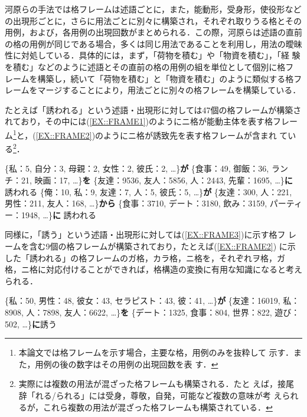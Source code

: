 \documentclass[japanese]{jnlp_1.4}
\begin{document}
 河原らの手法では格フレームは述語ごとに，また，能動形，受身形，使役形など
 の出現形ごとに，さらに用法ごとに別々に構築され，それぞれ取りうる格とその
 用例，および，各用例の出現回数がまとめられる．この際，河原らは述語の直前
 の格の用例が同じである場合，多くは同じ用法であることを利用し，用法の曖昧
 性に対処している．具体的には，まず，「荷物を積む」や「物資を積む」，「経
 験を積む」などのように述語とその直前の格の用例の組を単位として個別に格フ
 レームを構築し，続いて「荷物を積む」と「物資を積む」のように類似する格フ
 レームをマージすることにより，用法ごとに別々の格フレームを構築している．

 たとえば「誘われる」という述語・出現形に対しては47個の格フレームが構築さ
 れており，その中には(\ref{EX::FRAME1})のようにニ格が能動主体を表す格フレー
 ム\footnote{本論文では格フレームを示す場合，主要な格，用例のみを抜粋して
 示す．また，用例の後の数字はその用例の出現回数を表
 す．}と，(\ref{EX::FRAME2})のようにニ格が誘致先を表す格フレームが含まれ
 ている\footnote{実際には複数の用法が混ざった格フレームも構築される．たと
 えば，接尾辞「れる/られる」には受身，尊敬，自発，可能など複数の意味が考
 えられるが，これら複数の用法が混ざった格フレームも構築されている．}．
 
\begin{exe}
	\label{EX::FRAME1}
 \sn \{私：5, 自分：3, 母親：2, 女性：2, 彼氏：2, …\}\textbf{が}
 \sn \{食事：49, 御飯：36, ランチ：21, 映画：17, …\}\textbf{を}
 \sn \{友達：9536, 友人：5856, 人：2443, 先輩：1695, …\}\textbf{に} 誘われる
	\label{EX::FRAME2}
 \sn \{俺：10, 私：9, 友達：7, 人：5, 彼氏：5, …\}\textbf{が}
 \sn \{友達：300, 人：221, 男性：211, 友人：168, …\}\textbf{から}
 \sn \{食事：3710, デート：3180, 飲み：3159, パーティー：1948, …\}\textbf{に} 誘われる
\end{exe}

 同様に，「誘う」という述語・出現形に対しては(\ref{EX::FRAME3})に示す格フ
 レームを含む9個の格フレームが構築されており，たとえば(\ref{EX::FRAME2})
 に示した「誘われる」の格フレームのガ格，カラ格，ニ格を，それぞれヲ格，ガ
 格，ニ格に対応付けることができれば，格構造の変換に有用な知識になると考え
 られる．

\begin{exe}
	 \label{EX::FRAME3}
 \sn \{私：50, 男性：48, 彼女：43, セラピスト：43, 彼：41, …\}\textbf{が}
 \sn \{友達：16019, 私：8908, 人：7898, 友人：6622, …\}\textbf{を}
 \sn \{デート：1325, 食事：804, 世界：822, 遊び：502, …\}\textbf{に}誘う
\end{exe}
\end{document}

